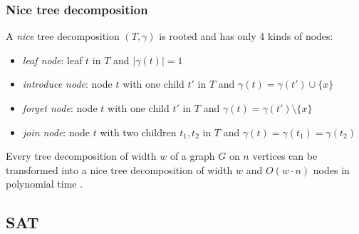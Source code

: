 \begin{frame}
  \frametitle{Nice tree decomposition}

  \noindent
  A \emph{nice} tree decomposition $(T,\gamma)$ is rooted and has only 4 kinds of nodes:
  \begin{itemize}
   \item \emph{leaf node}: leaf $t$ in $T$ and $|\gamma(t)|=1$
   \item \emph{introduce node}: node $t$ with one child $t'$ in $T$ and $\gamma(t) = \gamma(t') \cup \{x\}$
   \item \emph{forget node}: node $t$ with one child $t'$ in $T$ and $\gamma(t) = \gamma(t') \setminus \{x\}$
   \item \emph{join node}: node $t$ with two children $t_1,t_2$ in $T$ and $\gamma(t) = \gamma(t_1) = \gamma(t_2)$
  \end{itemize}
  Every tree decomposition of width $w$ of a graph $G$ on $n$ vertices can be transformed into a nice tree decomposition of width $w$ and $O(w\cdot n)$ nodes in polynomial time \cite{Kloks94}.

\end{frame}

\subsection{SAT}

